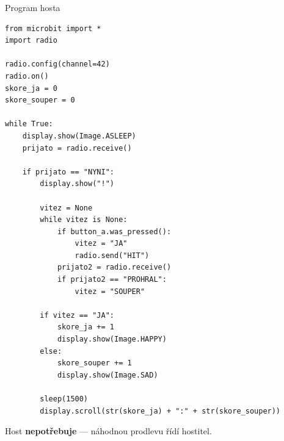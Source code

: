 \begin{frame}[fragile]{Program hosta}

\begin{lstlisting}[basicstyle=\tiny\ttfamily]
from microbit import *
import radio

radio.config(channel=42)
radio.on()
skore_ja = 0
skore_souper = 0

while True:
    display.show(Image.ASLEEP)
    prijato = radio.receive()

    if prijato == "NYNI":
        display.show("!")

        vitez = None
        while vitez is None:
            if button_a.was_pressed():
                vitez = "JA"
                radio.send("HIT")
            prijato2 = radio.receive()
            if prijato2 == "PROHRAL":
                vitez = "SOUPER"

        if vitez == "JA":
            skore_ja += 1
            display.show(Image.HAPPY)
        else:
            skore_souper += 1
            display.show(Image.SAD)

        sleep(1500)
        display.scroll(str(skore_ja) + ":" + str(skore_souper))
\end{lstlisting}

  Host \textbf{nepotřebuje}  — náhodnou prodlevu řídí hostitel.

\end{frame}

